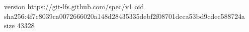 version https://git-lfs.github.com/spec/v1
oid sha256:4f7c8039ca0072666020a148d28435335debf2f08701dcca53bd9cdec588724a
size 43328

